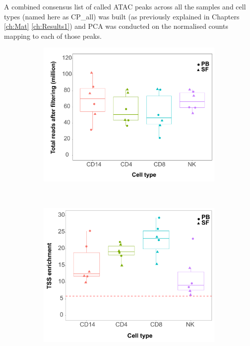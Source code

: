 A combined consensus list of called ATAC peaks across all the samples and cell types (named here as CP\_all) was built (as previously explained in Chapters \ref{ch:Mat} \ref{ch:Results1}) and PCA was conducted on the normalised counts mapping to each of those peaks.

 

\begin{figure}[H]
\centering
\begin{subfigure}[b]{0.48\textwidth}
\centering 
\includegraphics[width=\textwidth]{./Results3/pdfs/ATAC_PSA_total_filtered_reads_boxplot}
\caption{}
\end{subfigure}%
~
\begin{subfigure}[b]{0.48\textwidth} 
\centering
\includegraphics[width=\textwidth]{./Results3/pdfs/ATAC_PSA_all_TSS_max_per_cell_type}%

\end{subfigure}
\end{figure}
